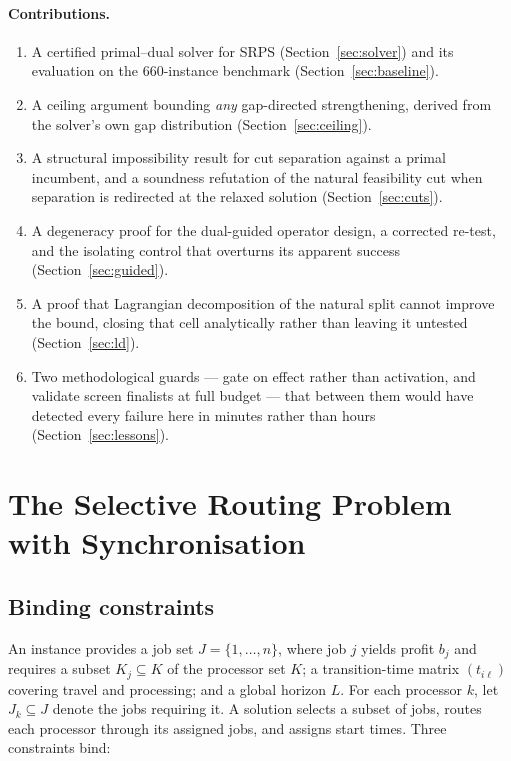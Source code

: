 \documentclass[11pt,a4paper]{article}
\newcommand{\Kj}{\ensuremath{K_j}}
\begin{document}
\paragraph{Contributions.}
\begin{enumerate}
  \item A certified primal--dual solver for SRPS (Section~\ref{sec:solver}) and
    its evaluation on the 660-instance benchmark (Section~\ref{sec:baseline}).
  \item A ceiling argument bounding \emph{any} gap-directed strengthening, derived
    from the solver's own gap distribution (Section~\ref{sec:ceiling}).
  \item A structural impossibility result for cut separation against a primal
    incumbent, and a soundness refutation of the natural feasibility cut when
    separation is redirected at the relaxed solution (Section~\ref{sec:cuts}).
  \item A degeneracy proof for the dual-guided operator design, a corrected
    re-test, and the isolating control that overturns its apparent success
    (Section~\ref{sec:guided}).
  \item A proof that Lagrangian decomposition of the natural split cannot improve
    the bound, closing that cell analytically rather than leaving it untested
    (Section~\ref{sec:ld}).
  \item Two methodological guards --- gate on effect rather than activation, and
    validate screen finalists at full budget --- that between them would have
    detected every failure here in minutes rather than hours
    (Section~\ref{sec:lessons}).
\end{enumerate}

\section{The Selective Routing Problem with Synchronisation}\label{sec:problem}

\subsection{Binding constraints}\label{sec:constraints}

An instance provides a job set $J=\{1,\dots,n\}$, where job $j$ yields profit
$b_j$ and requires a subset $\Kj\subseteq K$ of the processor set $K$; a
transition-time matrix $(t_{i\ell})$ covering travel and processing; and a global
horizon $L$. For each processor $k$, let $J_k\subseteq J$ denote the jobs
requiring it. A solution selects a subset of jobs, routes each processor through
its assigned jobs, and assigns start times. Three constraints bind:
\end{document}
